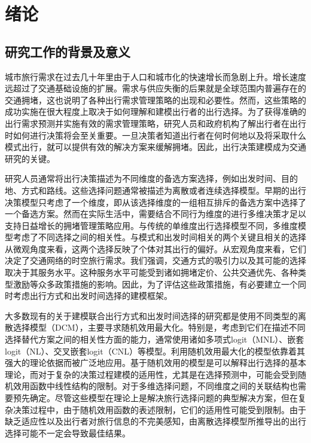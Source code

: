 \chapter{绪论}
\label{chp:installation}


\section{研究工作的背景及意义}

城市旅行需求在过去几十年里由于人口和城市化的快速增长而急剧上升。增长速度远超过了交通基础设施的扩展。需求与供应失衡的后果就是全球范围内普遍存在的交通拥堵，这也说明了各种出行需求管理策略的出现和必要性。然而，这些策略的成功实施在很大程度上取决于如何理解和建模出行者的出行选择。为了获得准确的出行需求预测并实施有效的需求管理策略，研究人员和政府机构了解出行者在出行时如何进行决策将会至关重要。一旦决策者知道出行者在何时何地以及将采取什么模式出行，就可以提供有效的解决方案来缓解拥堵。因此，出行决策建模成为交通研究的关键。

研究人员通常将出行决策描述为不同维度的备选方案选择，例如出发时间、目的地、方式和路线。这些选择问题通常被描述为离散或者连续选择模型。早期的出行决策模型只考虑了一个维度，即从该选择维度的一组相互排斥的备选方案中选择了一个备选方案。然而在实际生活中，需要结合不同行为维度的进行多维决策才足以支持日益增长的拥堵管理策略应用。与传统的单维度出行选择模型不同，多维度模型考虑了不同选择之间的相关性。与模式和出发时间相关的两个关键且相关的选择从微观角度来看，这两个选择反映了个体对其出行的偏好。从宏观角度来看，它们决定了交通网络的时空旅行需求。我们强调，交通方式的吸引力以及其可能的选择取决于其服务水平。这种服务水平可能受到诸如拥堵定价、公共交通优先、各种类型激励等众多政策措施的影响。因此，为了评估这些政策措施，有必要建立一个同时考虑出行方式和出发时间选择的建模框架。


大多数现有的关于建模联合出行方式和出发时间选择的研究都是使用不同类型的离散选择模型（DCM），主要寻求随机效用最大化。特别是，考虑到它们在描述不同选择替代方案之间的相关性方面的能力，通常使用诸如多项式logit（MNL）、嵌套logit（NL）、交叉嵌套logit（CNL）等模型。利用随机效用最大化的模型依靠着其强大的理论依据而被广泛地应用。基于随机效用的模型是可以解释出行选择的基本理论，而对于复杂的决策过程建模的适用性，尤其是在选择预测中，可能会受到随机效用函数中线性结构的限制。对于多维选择问题，不同维度之间的关联结构也需要预先确定。尽管这些模型在理论上是解决旅行选择问题的典型解决方案，但在复杂决策过程中，由于随机效用函数的表述限制，它们的适用性可能受到限制。由于缺乏适应性以及出行者对旅行信息的不完美感知，由离散选择模型所推导出的出行选择可能不一定会导致最佳结果。

